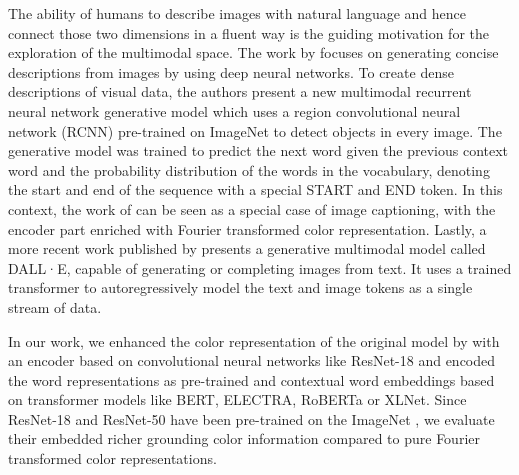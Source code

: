 \par
The ability of humans to describe images with natural language and hence connect those two dimensions in a fluent way is the guiding motivation for the exploration of the multimodal space. The work by \citep{karpathy-2014-image_descriptions} focuses on generating concise descriptions from images by using deep neural networks. To create dense descriptions of visual data, the authors present a new multimodal recurrent neural network generative model which uses a region convolutional neural network (RCNN) pre-trained on ImageNet \citep{deng-2009-imagenet} to detect objects in every image. The generative model was trained to predict the next word given the previous context word and the probability distribution of the words in the vocabulary, denoting the start and end of the sequence with a special START and END token. In this context, the work of \citep{monroe-2017-colors} can be seen as a special case of image captioning, with the encoder part enriched with Fourier transformed color representation. Lastly, a more recent work published by \citep{openai-2020-dalle} presents a generative multimodal model called DALL·E, capable of generating or completing images from text. It uses a trained transformer to autoregressively model the text and image tokens as a single stream of data.

\par
In our work, we enhanced the color representation of the original model by \citep{monroe-2017-colors} with an encoder based on convolutional neural networks like ResNet-18 and encoded the word representations as pre-trained and contextual word embeddings based on transformer models like BERT, ELECTRA, RoBERTa or XLNet. Since ResNet-18 and ResNet-50 have been pre-trained on the ImageNet \citep{imagenet-2019-dataset}, we evaluate their embedded richer grounding color information compared to pure Fourier transformed color representations.
